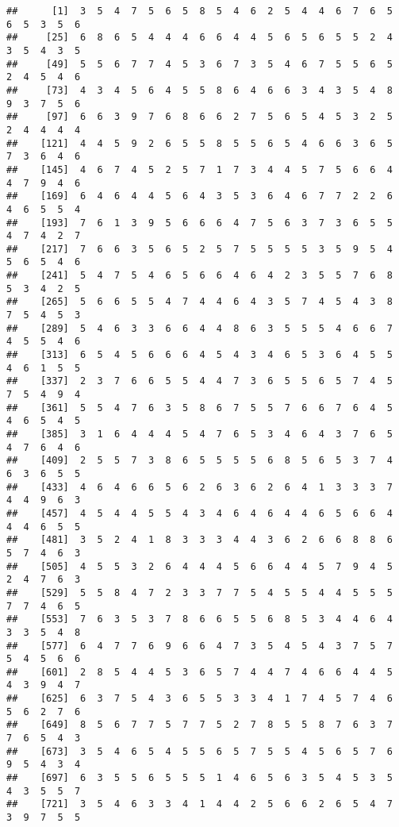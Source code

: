 \documentclass[
]{book}
\begin{document}
\begin{verbatim}
##      [1]  3  5  4  7  5  6  5  8  5  4  6  2  5  4  4  6  7  6  5  6  5  3  5  6
##     [25]  6  8  6  5  4  4  4  6  6  4  4  5  6  5  6  5  5  2  4  3  5  4  3  5
##     [49]  5  5  6  7  7  4  5  3  6  7  3  5  4  6  7  5  5  6  5  2  4  5  4  6
##     [73]  4  3  4  5  6  4  5  5  8  6  4  6  6  3  4  3  5  4  8  9  3  7  5  6
##     [97]  6  6  3  9  7  6  8  6  6  2  7  5  6  5  4  5  3  2  5  2  4  4  4  4
##    [121]  4  4  5  9  2  6  5  5  8  5  5  6  5  4  6  6  3  6  5  7  3  6  4  6
##    [145]  4  6  7  4  5  2  5  7  1  7  3  4  4  5  7  5  6  6  4  4  7  9  4  6
##    [169]  6  4  6  4  4  5  6  4  3  5  3  6  4  6  7  7  2  2  6  4  6  5  5  4
##    [193]  7  6  1  3  9  5  6  6  6  4  7  5  6  3  7  3  6  5  5  4  7  4  2  7
##    [217]  7  6  6  3  5  6  5  2  5  7  5  5  5  5  3  5  9  5  4  5  6  5  4  6
##    [241]  5  4  7  5  4  6  5  6  6  4  6  4  2  3  5  5  7  6  8  5  3  4  2  5
##    [265]  5  6  6  5  5  4  7  4  4  6  4  3  5  7  4  5  4  3  8  7  5  4  5  3
##    [289]  5  4  6  3  3  6  6  4  4  8  6  3  5  5  5  4  6  6  7  4  5  5  4  6
##    [313]  6  5  4  5  6  6  6  4  5  4  3  4  6  5  3  6  4  5  5  4  6  1  5  5
##    [337]  2  3  7  6  6  5  5  4  4  7  3  6  5  5  6  5  7  4  5  7  5  4  9  4
##    [361]  5  5  4  7  6  3  5  8  6  7  5  5  7  6  6  7  6  4  5  4  6  5  4  5
##    [385]  3  1  6  4  4  4  5  4  7  6  5  3  4  6  4  3  7  6  5  4  7  6  4  6
##    [409]  2  5  5  7  3  8  6  5  5  5  5  6  8  5  6  5  3  7  4  6  3  6  5  5
##    [433]  4  6  4  6  6  5  6  2  6  3  6  2  6  4  1  3  3  3  7  4  4  9  6  3
##    [457]  4  5  4  4  5  5  4  3  4  6  4  6  4  4  6  5  6  6  4  4  4  6  5  5
##    [481]  3  5  2  4  1  8  3  3  3  4  4  3  6  2  6  6  8  8  6  5  7  4  6  3
##    [505]  4  5  5  3  2  6  4  4  4  5  6  6  4  4  5  7  9  4  5  2  4  7  6  3
##    [529]  5  5  8  4  7  2  3  3  7  7  5  4  5  5  4  4  5  5  5  7  7  4  6  5
##    [553]  7  6  3  5  3  7  8  6  6  5  5  6  8  5  3  4  4  6  4  3  3  5  4  8
##    [577]  6  4  7  7  6  9  6  6  4  7  3  5  4  5  4  3  7  5  7  5  4  5  6  6
##    [601]  2  8  5  4  4  5  3  6  5  7  4  4  7  4  6  6  4  4  5  4  3  9  4  7
##    [625]  6  3  7  5  4  3  6  5  5  3  3  4  1  7  4  5  7  4  6  5  6  2  7  6
##    [649]  8  5  6  7  7  5  7  7  5  2  7  8  5  5  8  7  6  3  7  7  6  5  4  3
##    [673]  3  5  4  6  5  4  5  5  6  5  7  5  5  4  5  6  5  7  6  9  5  4  3  4
##    [697]  6  3  5  5  6  5  5  5  1  4  6  5  6  3  5  4  5  3  5  4  3  5  5  7
##    [721]  3  5  4  6  3  3  4  1  4  4  2  5  6  6  2  6  5  4  7  3  9  7  5  5

\end{verbatim}
\end{document}
